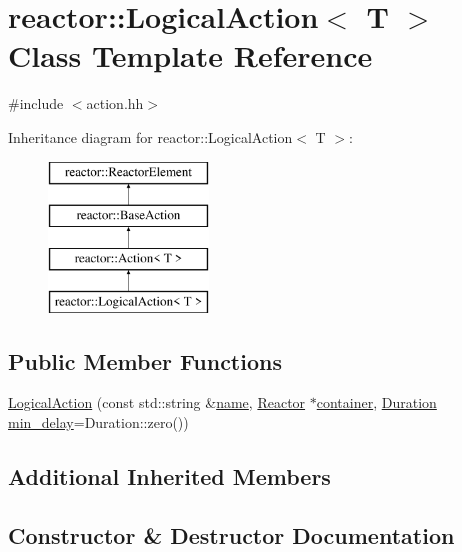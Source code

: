 \hypertarget{classreactor_1_1LogicalAction}{}\section{reactor\+:\+:Logical\+Action$<$ T $>$ Class Template Reference}
\label{classreactor_1_1LogicalAction}


{\ttfamily \#include $<$action.\+hh$>$}

Inheritance diagram for reactor\+:\+:Logical\+Action$<$ T $>$\+:\begin{figure}[H]
\begin{center}
\leavevmode
\includegraphics[height=4.000000cm]{classreactor_1_1LogicalAction}
\end{center}
\end{figure}
\subsection*{Public Member Functions}
\begin{DoxyCompactItemize}
\item 
\hyperlink{classreactor_1_1LogicalAction_abb4c5b2637a33f13be3aa182758bb510}{Logical\+Action} (const std\+::string \&\hyperlink{classreactor_1_1ReactorElement_a99579f61dbaf5d5d98aebfe26eb8bf77}{name}, \hyperlink{classreactor_1_1Reactor}{Reactor} $\ast$\hyperlink{classreactor_1_1ReactorElement_a25bf298de879a82eefc1ba426be05812}{container}, \hyperlink{namespacereactor_aa8375b807a80703545664096c5b5b779}{Duration} \hyperlink{classreactor_1_1BaseAction_a98201db474f34cb9e38151a6960128f0}{min\+\_\+delay}=Duration\+::zero())
\end{DoxyCompactItemize}
\subsection*{Additional Inherited Members}


\subsection{Constructor \& Destructor Documentation}
\mbox{\label{classreactor_1_1LogicalAction_abb4c5b2637a33f13be3aa182758bb510}} 
